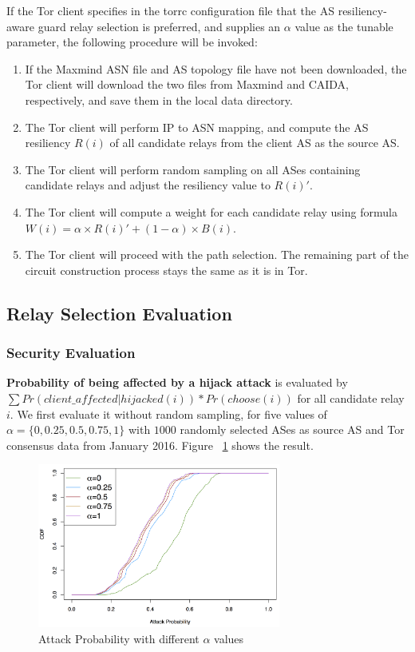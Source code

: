If the Tor client specifies in the torrc configuration file that the AS resiliency-aware guard relay selection is preferred, and supplies an $\alpha$ value as the tunable parameter, the following procedure will be invoked:

\begin{enumerate}
\item If the Maxmind ASN file and AS topology file have not been downloaded, the Tor client will download the two files from Maxmind and CAIDA, respectively, and save them in the local data directory. 
\item The Tor client will perform IP to ASN mapping, and compute the AS resiliency $R(i)$ of all candidate relays from the client AS as the source AS. 
\item The Tor client will perform random sampling on all ASes containing candidate relays and adjust the resiliency value to $R(i)\prime$.
\item The Tor client will compute a weight for each candidate relay using formula $W(i) = \alpha \times R(i) \prime + (1 - \alpha) \times B(i)$. 
\item The Tor client will proceed with the path selection. The remaining part of the circuit construction process stays the same as it is in Tor. 
\end{enumerate}

\subsection{Relay Selection Evaluation}

\subsubsection{Security Evaluation}

\textbf{Probability of being affected by a hijack attack} is evaluated by
 $\sum Pr(client\_affected | hijacked(i)) * Pr(choose(i))$ for all candidate relay $i$. We first evaluate it without random sampling, for five values of $\alpha=\{0, 0.25, 0.5, 0.75, 1\}$ with $1000$ randomly selected ASes as source AS and Tor consensus data from January 2016. Figure ~\ref{fig_attack} shows the result. 

\begin{figure}[ht!]
\centering
\includegraphics[width=80mm]{figure/attack}
\caption{Attack Probability with different $\alpha$ values \label{fig_attack}}
\end{figure}


